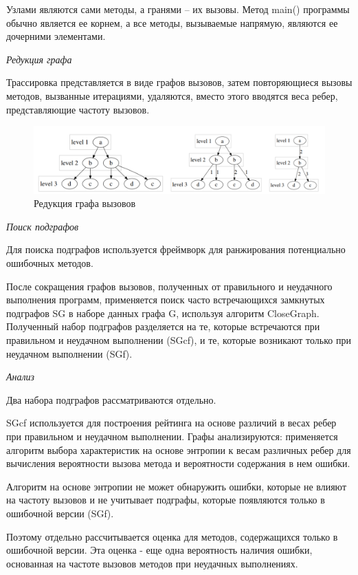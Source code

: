 Узлами являются сами методы, а гранями -- их вызовы. Метод main() программы обычно является ее корнем, а все методы, вызываемые напрямую, являются ее дочерними элементами.

\textit{Редукция графа}

Трассировка представляется в виде графов вызовов, затем повторяющиеся вызовы методов, вызванные итерациями, удаляются, вместо этого вводятся веса ребер, представляющие частоту вызовов. 

\begin{figure}[h]
	\centering
	\includegraphics[width=1\textwidth]{ResearchNotes/rndhpc_not_edt_2021_11_10/krekhtunova/reduction.png}
	\caption{Редукция графа вызовов} 
\end{figure}

\textit{Поиск подграфов}

Для поиска подграфов используется фреймворк для ранжирования потенциально ошибочных методов.

После сокращения графов вызовов, полученных от правильного и неудачного выполнения программ, применяется поиск часто встречающихся замкнутых подграфов SG в наборе данных графа G, используя алгоритм CloseGraph. Полученный набор подграфов разделяется на те, которые встречаются при правильном и неудачном выполнении (SGcf), и те, которые возникают только при неудачном выполнении (SGf).

\textit{Анализ}

Два набора подграфов рассматриваются отдельно.

SGcf используется для построения рейтинга на основе различий в весах ребер при правильном и неудачном выполнении. Графы анализируются: применяется алгоритм выбора характеристик на основе энтропии к весам различных ребер для вычисления вероятности вызова метода и вероятности содержания в нем ошибки.

Алгоритм на основе энтропии не может обнаружить ошибки, которые не влияют на частоту вызовов и не учитывает подграфы, которые появляются только в ошибочной версии (SGf).

Поэтому отдельно рассчитывается оценка для методов, содержащихся только в ошибочной версии. Эта оценка - еще одна вероятность наличия ошибки, основанная на частоте вызовов методов при неудачных выполнениях.

